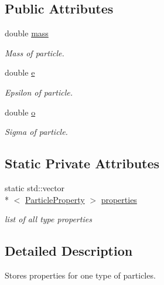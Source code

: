 \subsection*{Public Attributes}
\begin{DoxyCompactItemize}
\item 
double \hyperlink{classSimulation_1_1ParticleProperty_a8f145877445ca59f131da94402d2f754}{mass}
\begin{DoxyCompactList}\small\item\em Mass of particle. \end{DoxyCompactList}\item 
double \hyperlink{classSimulation_1_1ParticleProperty_a3b5090b0388ea6708f204377648b9f7d}{e}
\begin{DoxyCompactList}\small\item\em Epsilon of particle. \end{DoxyCompactList}\item 
double \hyperlink{classSimulation_1_1ParticleProperty_a53851810b9a7de47591967ce60b69367}{o}
\begin{DoxyCompactList}\small\item\em Sigma of particle. \end{DoxyCompactList}\end{DoxyCompactItemize}
\subsection*{Static Private Attributes}
\begin{DoxyCompactItemize}
\item 
static std\-::vector\\*
$<$ \hyperlink{classSimulation_1_1ParticleProperty}{Particle\-Property} $>$ \hyperlink{classSimulation_1_1ParticleProperty_a347c0996e25e4d4fa48ca1ce3db7e7f7}{properties}
\begin{DoxyCompactList}\small\item\em list of all type properties \end{DoxyCompactList}\end{DoxyCompactItemize}


\subsection{Detailed Description}
Stores properties for one type of particles. 

